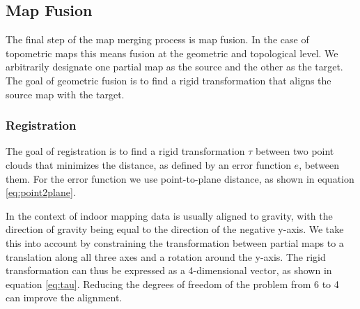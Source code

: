 \subsection{Map Fusion}
The final step of the map merging process is map fusion. In the case of topometric maps this means fusion at the geometric and topological level. We arbitrarily designate one partial map as the source and the other as the target. The goal of geometric fusion is to find a rigid transformation that aligns the source map with the target.


\subsubsection{Registration}

The goal of registration is to find a rigid transformation \(\tau\) between two point clouds that minimizes the distance, as defined by an error function \(e\), between them. For the error function we use point-to-plane distance, as shown in equation \ref{eq:point2plane}.

In the context of indoor mapping data is usually aligned to gravity, with the direction of gravity being equal to the direction of the negative y-axis. We take this into account by constraining the transformation between partial maps to a translation along all three axes and a rotation around the y-axis. The rigid transformation can thus be expressed as a 4-dimensional vector, as shown in equation \ref{eq:tau}. Reducing the degrees of freedom of the problem from 6 to 4 can improve the alignment.


